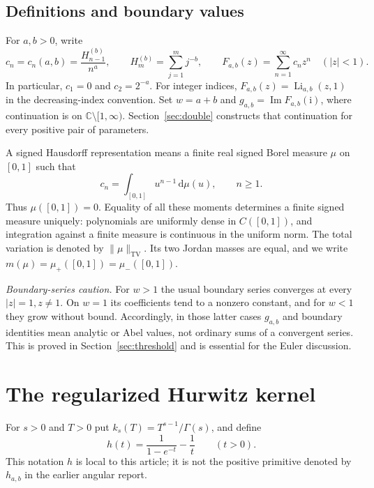 \documentclass[11pt]{article}
\numberwithin{equation}{section}
\theoremstyle{definition}\newtheorem{definition}[theorem]{Definition}
\theoremstyle{remark}\newtheorem{remark}[theorem]{Remark}
\newcommand{\dd}{\,\mathrm d}
\newcommand{\C}{\mathbb C}
\newcommand{\ii}{\mathrm i}
\DeclareMathOperator{\Li}{Li}
\DeclareMathOperator{\Impart}{Im}
\newcommand{\cut}{\C\setminus[1,\infty)}
\begin{document}
\subsection{Definitions and boundary values}
For $a,b>0$, write
\begin{equation}\label{eq:def}
 c_n=c_n(a,b)=\frac{H_{n-1}^{(b)}}{n^a},\qquad
 H_m^{(b)}=\sum_{j=1}^m j^{-b},\qquad
 F_{a,b}(z)=\sum_{n=1}^{\infty}c_nz^n\quad(|z|<1).
\end{equation}
In particular, $c_1=0$ and $c_2=2^{-a}$. For integer indices,
$F_{a,b}(z)=\Li_{a,b}(z,1)$ in the decreasing-index convention.
Set $w=a+b$ and $g_{a,b}=\Impart F_{a,b}(\ii)$, where continuation
is on $\cut$. Section~\ref{sec:double} constructs that continuation
for every positive pair of parameters.

A signed Hausdorff representation means a finite real signed Borel
measure $\mu$ on $[0,1]$ such that
\begin{equation}\label{eq:moments}
 c_n=\int_{[0,1]}u^{n-1}\dd\mu(u),\qquad n\ge1.
\end{equation}
Thus $\mu([0,1])=0$. Equality of all these moments determines a finite
signed measure uniquely: polynomials are uniformly dense in
$C([0,1])$, and integration against a finite measure is continuous
in the uniform norm. The total variation is denoted by
$\|\mu\|_{\mathrm{TV}}$. Its two Jordan masses are equal, and we write
$m(\mu)=\mu_+([0,1])=\mu_-([0,1])$.

\emph{Boundary-series caution.} For $w>1$ the usual boundary series
converges at every $|z|=1,z\ne1$. On $w=1$ its coefficients tend to a
nonzero constant, and for $w<1$ they grow without bound. Accordingly,
in those latter cases $g_{a,b}$ and boundary identities mean analytic
or Abel values, not ordinary sums of a convergent series. This is proved
in Section~\ref{sec:threshold} and is essential for the Euler discussion.

\section{The regularized Hurwitz kernel}
\label{sec:regularization}

For $s>0$ and $T>0$ put $k_s(T)=T^{s-1}/\Gamma(s)$, and define
\begin{equation}\label{eq:h}
 h(t)=\frac1{1-e^{-t}}-\frac1t\qquad(t>0).
\end{equation}
This notation $h$ is local to this article; it is not the positive
primitive denoted by $h_{a,b}$ in the earlier angular report.
\end{document}
